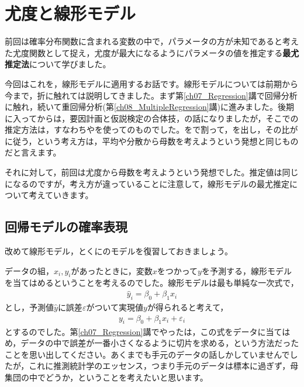 \documentclass{ltjbook}
\begin{document}
\chapter{尤度と線形モデル}
\label{b24_linear_model}
前回は確率分布関数に含まれる変数の中で，パラメータの方が未知であると考えた尤度関数として捉え，尤度が最大になるようにパラメータの値を推定する\textbf{最尤推定法}について学びました。

今回はこれを，線形モデルに適用するお話です。線形モデルについては前期から今まで，折に触れては説明してきました。まず第\ref{ch07_Regression}講で回帰分析に触れ，続いて重回帰分析(第\ref{ch08_MultipleRegression}講)に進みました。後期に入ってからは，要因計画と仮説検定の合体技，の話になりましたが，そこでの推定方法は，すなわちやを使ってのものでした。をで割って，を出し，その比がに従う，という考え方は，平均や分散から母数を考えようという発想と同じものだと言えます。

それに対して，前回は尤度から母数を考えようという発想でした。推定値は同じになるのですが，考え方が違っていることに注意して，線形モデルの最尤推定について考えていきます。

\section{回帰モデルの確率表現}
改めて線形モデル，とくにのモデルを復習しておきましょう。

データの組，$x_i,y_i$があったときに，変数$x$をつかって$y$を予測する，線形モデルを当てはめるということを考えるのでした。線形モデルは最も単純な一次式で，
\begin{align}
\hat{y}_i = \beta_0 + \beta_1 x_i
\end{align}
とし，予測値$\hat{y}$に誤差$\varepsilon$がついて実現値$y$が得られると考えて，
\begin{align}
y_i= \beta_0 + \beta_1 x_i + \varepsilon_i
\end{align}
とするのでした。第\ref{ch07_Regression}講でやったは，この式をデータに当てはめ，データの中で誤差が一番小さくなるように切片を求める，という方法だったことを思い出してください。あくまでも手元のデータの話しかしていませんでしたが，これに推測統計学のエッセンス，つまり手元のデータは標本に過ぎず，母集団の中でどうか，ということを考えたいと思います。
\end{document}

